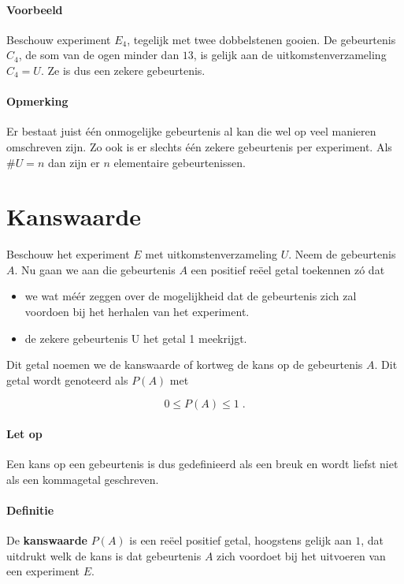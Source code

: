 \documentclass[12pt,twoside]{article}
\begin{document}
\paragraph*{Voorbeeld} Beschouw experiment $E_4$, tegelijk met twee dobbelstenen gooien. De gebeurtenis $C_4$, de som van de ogen minder dan $13$, is gelijk aan de uitkomstenverzameling $C_4=U$. Ze is dus een zekere gebeurtenis.

\paragraph*{Opmerking}
Er bestaat juist één onmogelijke gebeurtenis al kan die wel op veel manieren omschreven zijn. Zo ook is er slechts één zekere gebeurtenis per experiment. Als $\#U = n$ dan zijn er $n$ elementaire gebeurtenissen.

\section{Kanswaarde}

Beschouw het experiment $E$ met uitkomstenverzameling $U$. Neem de gebeurtenis $A$.
Nu gaan we aan die gebeurtenis $A$ een positief reëel getal toekennen zó dat
\begin{itemize}
  \item we wat méér zeggen over de mogelijkheid dat de gebeurtenis zich zal voordoen bij het herhalen van het experiment.
  \item de zekere gebeurtenis U het getal 1 meekrijgt.
\end{itemize}

Dit getal noemen we de kanswaarde of kortweg de kans op de gebeurtenis $A$. Dit getal wordt genoteerd als $P(A)$ met\\
\begin{mdframed}
$$0 \leq P(A) \leq 1\;.$$
\end{mdframed}

\paragraph*{Let op} Een kans op een gebeurtenis is dus gedefinieerd als een breuk en wordt liefst niet als
een kommagetal geschreven.

\paragraph*{Definitie} De {\bf kanswaarde} $P(A)$ is een reëel positief getal, hoogstens gelijk aan $1$, dat uitdrukt welk de kans is dat gebeurtenis $A$ zich voordoet bij het uitvoeren van een experiment $E$.
\end{document}
